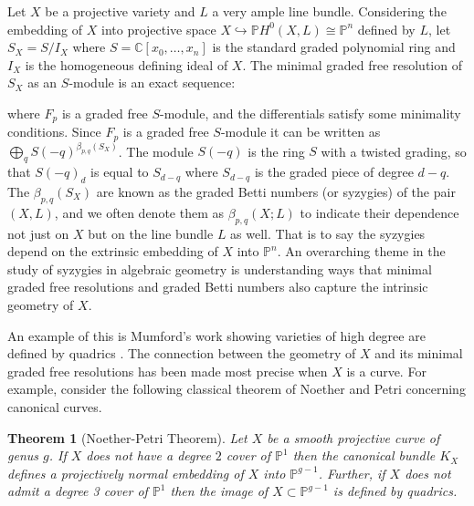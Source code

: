 \documentclass[11pt,reqno]{amsart}
\newtheorem{theorem}[lemma]{Theorem}
\theoremstyle{remark}
\newcommand{\CC}{\mathbb{C}}
\newcommand{\PP}{\mathbb{P}}
\begin{document}
Let $X$ be a projective variety and $L$ a very ample line bundle. Considering the embedding of $X$ into projective space $X \hookrightarrow \PP H^{0}(X,L)\cong \PP^{n}$ defined by $L$, let $S_{X}=S/I_{X}$ where $S=\CC[x_{0},\ldots,x_{n}]$ is the standard graded polynomial ring and $I_{X}$ is the homogeneous defining ideal of $X$. The minimal graded free resolution of $S_{X}$ as an $S$-module is an exact sequence:
\begin{center}
\end{center}
where $F_{p}$ is a graded free $S$-module, and the differentials satisfy some minimality conditions. Since $F_{p}$ is a graded free $S$-module it can be written as $\bigoplus_{q}S(-q)^{\beta_{p,q}(S_{X})}$. The module $S(-q)$ is the ring $S$ with a twisted grading, so that $S(-q)_{d}$ is equal to $S_{d-q}$ where $S_{d-q}$ is the graded piece of degree $d-q$. The $\beta_{p,q}(S_{X})$ are known as the graded Betti numbers (or syzygies) of the pair $(X,L)$, and we often denote them as $\beta_{p,q}(X;L)$ to indicate their dependence not just on $X$ but on the line bundle $L$ as well. That is to say the syzygies depend on the extrinsic embedding of $X$ into $\PP^{n}$. An overarching theme in the study of syzygies in algebraic geometry is understanding ways that minimal graded free resolutions and graded Betti numbers also capture the intrinsic geometry of $X$.   

An example of this is Mumford's work showing varieties of high degree are defined by quadrics \cite{mumford70}. The connection between the geometry of $X$ and its minimal graded free resolutions has been made most precise when $X$ is a curve. For example, consider the following classical theorem of Noether and Petri concerning canonical curves.

\begin{theorem}[Noether-Petri Theorem]\label{thm:noether-petri}
	Let $X$ be a smooth projective curve of genus $g$. If $X$ does not have a degree $2$ cover of $\PP^{1}$ then the canonical bundle $K_{X}$ defines a projectively normal embedding of $X$ into $\PP^{g-1}$. Further, if $X$ does not admit a degree 3 cover of $\PP^{1}$ then the image of $X\subset \PP^{g-1}$ is defined by quadrics. 
\end{theorem}
\end{document}
